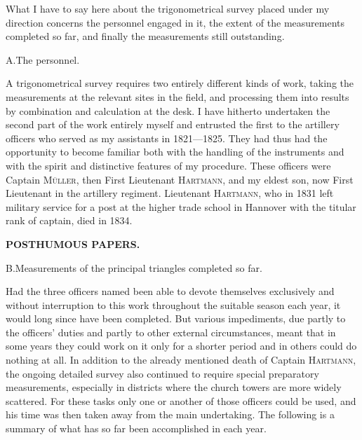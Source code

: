 \par\noindent\hspace*{\parindent}What I have to say here about the trigonometrical survey placed under my direction concerns the personnel engaged in it, the extent of the measurements completed so far, and finally the measurements still outstanding.

\begin{center}
A.\quad The personnel.
\end{center}

\par\noindent\hspace*{\parindent}A trigonometrical survey requires two entirely different kinds of work, taking the measurements at the relevant sites in the field, and processing them into results by combination and calculation at the desk. I have hitherto undertaken the second part of the work entirely myself and entrusted the first to the artillery officers who served as my assistants in 1821---1825. They had thus had the opportunity to become familiar both with the handling of the instruments and with the spirit and distinctive features of my procedure. These officers were Captain \textsc{Müller}, then First Lieutenant \textsc{Hartmann}, and my eldest son, now First Lieutenant in the artillery regiment. Lieutenant \textsc{Hartmann}, who in 1831 left military service for a post at the higher trade school in Hannover with the titular rank of captain, died in 1834.

\par\clearpage
\noindent{}\hfill{\small\textbf{POSTHUMOUS PAPERS.}}\hfill\null\par\medskip

\begin{center}
B.\quad Measurements of the principal triangles completed so far.
\end{center}

\par\noindent\hspace*{\parindent}Had the three officers named been able to devote themselves exclusively and without interruption to this work throughout the suitable season each year, it would long since have been completed. But various impediments, due partly to the officers' duties and partly to other external circumstances, meant that in some years they could work on it only for a shorter period and in others could do nothing at all. In addition to the already mentioned death of Captain \textsc{Hartmann}, the ongoing detailed survey also continued to require special preparatory measurements, especially in districts where the church towers are more widely scattered. For these tasks only one or another of those officers could be used, and his time was then taken away from the main undertaking. The following is a summary of what has so far been accomplished in each year.

